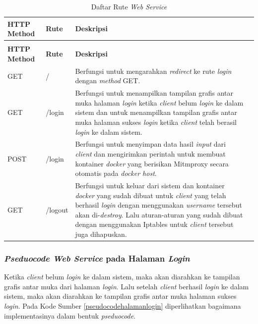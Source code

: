 \begin{longtable}{|p{}|p{}|p{}|p{}|} %
	
	\caption{Daftar Rute \textit{Web Service}} \label{tabelRuteWebServiceHalamnLogin} \\
	\hline
	\textbf{HTTP Method} & \textbf{Rute} & \textbf{Deskripsi} \\ \hline
	
	\endfirsthead
	\caption[]{Daftar Rute \textit{Web Service}}  \\
	\hline
	\textbf{HTTP Method} & \textbf{Rute} & \textbf{Deskripsi}  \\ \hline
	
	\endhead
	\endfoot
	\endlastfoot
	
	GET & / & Berfungsi untuk mengarahkan \textit{redirect} ke rute \textit{login} dengan \textit{method} GET.\\ \hline
	GET & /login & Berfungsi untuk menampilkan tampilan grafis antar muka halaman \textit{login} ketika \textit{client} belum \textit{login} ke dalam sistem dan untuk menampilkan tampilan grafis antar muka halaman sukses \textit{login} ketika \textit{client} telah berasil \textit{login} ke dalam sistem.\\ \hline
	POST & /login & Berfungsi untuk menyimpan data hasil \textit{input} dari \textit{client} dan mengirimkan perintah untuk membuat kontainer \textit{docker} yang berisikan Mitmproxy secara otomatis pada \textit{docker host}.\\ \hline
	GET & /logout & Berfungsi untuk keluar dari sistem dan kontainer \textit{docker} yang sudah dibuat untuk \textit{client} yang telah berhasil \textit{login} dengan menggunakan \textit{username} tersebut akan di-\textit{destroy}. Lalu aturan-aturan yang sudah dibuat dengan menggunakan Iptables untuk \textit{client} tersebut juga dihapuskan.\\ \hline
	
\end{longtable}

\subsubsection{\textit{Pseduocode Web Service} pada Halaman \textit{Login}}
Ketika \textit{client} belum \textit{login} ke dalam sistem, maka akan diarahkan ke tampilan grafis antar muka dari halaman \textit{login}. Lalu setelah \textit{client} berhasil \textit{login} ke dalam sistem, maka akan diarahkan ke tampilan grafis antar muka halaman sukses \textit{login}. Pada Kode Sumber \ref{pseudocodehalamanlogin} diperlihatkan bagaimana implementasinya dalam bentuk \textit{pseduocode}.


